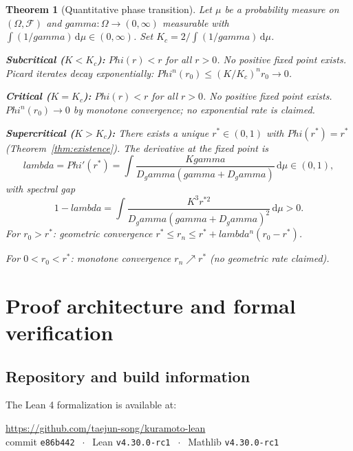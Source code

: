 \documentclass[11pt,a4paper]{article}
\let\Phi\relax\def\Phi{Phi}%
\let\lambda\relax\def\lambda{lambda}%
\let\gamma\relax\def\gamma{gamma}%
\newtheorem{theorem}{Theorem}[section]
\theoremstyle{definition}
\begin{document}
\begin{theorem}[Quantitative phase transition]\label{thm:main}
Let $\mu$ be a probability measure on $(\Omega, \mathcal{F})$ and $\gamma : \Omega \to (0,\infty)$ measurable with $\int (1/\gamma)\,\mathrm{d}\mu \in (0,\infty)$. Set $K_c = 2/\int(1/\gamma)\,\mathrm{d}\mu$.

\medskip\noindent\textbf{Subcritical ($K < K_c$):} $\Phi(r) < r$ for all $r > 0$. No positive fixed point exists. Picard iterates decay exponentially: $\Phi^n(r_0) \leq (K/K_c)^n r_0 \to 0$.

\medskip\noindent\textbf{Critical ($K = K_c$):} $\Phi(r) < r$ for all $r > 0$. No positive fixed point exists. $\Phi^n(r_0) \to 0$ by monotone convergence; no exponential rate is claimed.

\medskip\noindent\textbf{Supercritical ($K > K_c$):} There exists a unique $r^* \in (0,1)$ with $\Phi(r^*) = r^*$ (Theorem~\ref{thm:existence}). The derivative at the fixed point is
\[
\lambda = \Phi'(r^*) = \int \frac{K\gamma}{D_\gamma(\gamma + D_\gamma)}\,\mathrm{d}\mu \in (0,1),
\]
with spectral gap
\[
1 - \lambda = \int \frac{K^3 r^{*2}}{D_\gamma(\gamma + D_\gamma)^2}\,\mathrm{d}\mu > 0.
\]
For $r_0 > r^*$: geometric convergence $r^* \leq r_n \leq r^* + \lambda^n(r_0 - r^*)$.

\noindent For $0 < r_0 < r^*$: monotone convergence $r_n \nearrow r^*$ (no geometric rate claimed).
\end{theorem}

\section{Proof architecture and formal verification}\label{sec:formal}

\subsection{Repository and build information}

The Lean 4 formalization is available at:

\begin{center}
\url{https://github.com/taejun-song/kuramoto-lean}\\[2pt]
commit \texttt{e86b442} $\;\cdot\;$ Lean \texttt{v4.30.0-rc1} $\;\cdot\;$ Mathlib \texttt{v4.30.0-rc1}
\end{center}
\end{document}
